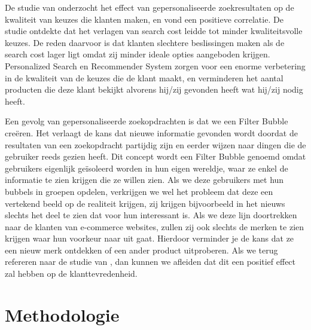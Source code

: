 De studie van \textcite{Diehl2003} onderzocht het effect van gepersonaliseerde zoekresultaten op de kwaliteit van keuzes die klanten maken, en vond een positieve correlatie. De studie ontdekte dat het verlagen van search cost \autocite{Smith1999} leidde tot minder kwaliteitsvolle keuzes. De reden daarvoor is dat klanten slechtere beslissingen maken als de search cost lager ligt omdat zij minder ideale opties aangeboden krijgen. Personalized Search en Recommender System zorgen voor een enorme verbetering in de kwaliteit van de keuzes die de klant maakt, en verminderen het aantal producten die deze klant bekijkt alvorens hij/zij gevonden heeft wat hij/zij nodig heeft.

Een gevolg van gepersonaliseerde zoekopdrachten is dat we een Filter Bubble \autocite{Pariser2011} creëren. Het verlaagt de kans dat nieuwe informatie gevonden wordt doordat de resultaten van een zoekopdracht partijdig zijn en eerder wijzen naar dingen die de gebruiker reeds gezien heeft. Dit concept wordt een Filter Bubble genoemd omdat gebruikers eigenlijk geïsoleerd worden in hun eigen wereldje, waar ze enkel de informatie te zien krijgen die ze willen zien. Als we deze gebruikers met hun bubbels in groepen opdelen, verkrijgen we wel het probleem dat deze een vertekend beeld op de realiteit krijgen, zij krijgen bijvoorbeeld in het nieuws slechts het deel te zien dat voor hun interessant is. Als we deze lijn doortrekken naar de klanten van e-commerce websites, zullen zij ook slechts de merken te zien krijgen waar hun voorkeur naar uit gaat. Hierdoor verminder je de kans dat ze een nieuw merk ontdekken of een ander product uitproberen. Als we terug refereren naar de studie van \textcite{Diehl2003}, dan kunnen we afleiden dat dit een positief effect zal hebben op de klanttevredenheid.



\section{Methodologie}
\label{sec:methodologie}

